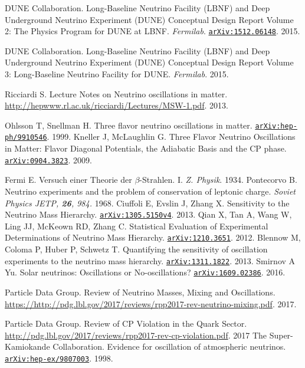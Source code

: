 \begin{thebibliography}{100}
	 DUNE Collaboration. Long-Baseline Neutrino Facility (LBNF) and
		Deep Underground Neutrino Experiment (DUNE) Conceptual Design Report Volume
		2: The Physics Program for DUNE at LBNF. \textit{Fermilab}.
		\href{https://arxiv.org/abs/1512.06148}{\texttt{arXiv:1512.06148}}. 2015.

	 DUNE Collaboration. Long-Baseline Neutrino Facility (LBNF)
		and Deep Underground Neutrino Experiment (DUNE) Conceptual Design Report
		Volume 3: Long-Baseline Neutrino Facility for DUNE. \textit{Fermilab}. 2015.


	 Ricciardi S. Lecture Notes on Neutrino oscillations in
		matter.
		\url{http://hepwww.rl.ac.uk/ricciardi/Lectures/MSW-1.pdf}. 2013.

	 Ohlsson T, Snellman H. Three flavor neutrino oscillations
		in matter.
		\href{https://arxiv.org/abs/hep-ph/9910546v4}{\texttt{arXiv:hep-ph/9910546}}. 1999.
	 Kneller J, McLaughlin G. Three Flavor Neutrino Oscillations
		in Matter: Flavor Diagonal Potentials, the Adiabatic Basis and the CP
		phase. \href{https://arxiv.org/abs/0904.3823}{\texttt{arXiv:0904.3823}}. 2009.

	 Fermi E. Versuch einer Theorie der $\beta$-Strahlen. I.
		\textit{Z. Physik}. 1934.
	 Pontecorvo B. Neutrino experiments and the problem of
		conservation of leptonic charge. \textit{Soviet Physics JETP, \textbf{26},
		984.} 1968.
	 Ciuffoli E, Evslin J, Zhang X. Sensitivity to the
		Neutrino Mass Hierarchy.
		\href{https://arxiv.org/abs/1305.5150v4}{\texttt{arXiv:1305.5150v4}}. 2013.
	 Qian X, Tan A, Wang W, Ling JJ, McKeown RD, Zhang C.
		Statistical Evaluation of Experimental Determinations of Neutrino Mass
		Hierarchy.
		\href{https://arxiv.org/abs/1210.3651}{\texttt{arXiv:1210.3651}}. 2012.
	 Blennow M, Coloma P, Huber P, Schwetz T. Quantifying the
		sensitivity of oscillation experiments to the neutrino mass hierarchy.
		\href{https://arxiv.org/pdf/1311.1822.pdf}{\texttt{arXiv:1311.1822}}. 2013.
	 Smirnov A Yu. Solar neutrinos: Oscillations or
		No-oscillations?
		\href{https://arxiv.org/abs/1609.02386}{\texttt{arXiv:1609.02386}}. 2016.

	 Particle Data Group. Review of Neutrino Masses, Mixing and
		Oscillations.
		\url{https://http://pdg.lbl.gov/2017/reviews/rpp2017-rev-neutrino-mixing.pdf}.
		2017.

	 Particle Data Group. Review of CP Violation in the Quark Sector.
		\url{http://pdg.lbl.gov/2017/reviews/rpp2017-rev-cp-violation.pdf}. 2017
	 The Super-Kamiokande Collaboration. Evidence for oscillation
		of atmospheric neutrinos.
		\href{https://arxiv.org/abs/hep-ex/9807003}{\texttt{arXiv:hep-ex/9807003}}. 1998.


\end{thebibliography}
